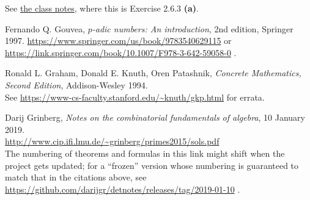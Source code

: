 \documentclass[paper=a4, fontsize=12pt]{scrartcl} %
\theoremstyle{plainsl}
\theoremstyle{definition}
\theoremstyle{remark}
\begin{document}
See
\href{http://www-users.math.umn.edu/~dgrinber/19s/notes.pdf}{the class notes},
where this is Exercise 2.6.3 \textbf{(a)}.

\begin{thebibliography}{99999999}                                                                                         %


Fernando Q. Gouvea,
\textit{$p$-adic numbers: An introduction},
2nd edition, Springer 1997.
\url{https://www.springer.com/us/book/9783540629115} or
\url{https://link.springer.com/book/10.1007/F978-3-642-59058-0} .

Ronald L. Graham, Donald E. Knuth, Oren Patashnik,
\textit{Concrete Mathematics, Second Edition}, Addison-Wesley 1994.\\
See \url{https://www-cs-faculty.stanford.edu/~knuth/gkp.html} for errata.

Darij Grinberg,
\textit{Notes on the combinatorial fundamentals of algebra},
10 January 2019. \\
\url{http://www.cip.ifi.lmu.de/~grinberg/primes2015/sols.pdf}
\\
The numbering of theorems and formulas in this link might shift
when the project gets updated; for a ``frozen'' version whose
numbering is guaranteed to match that in the citations above, see
\url{https://github.com/darijgr/detnotes/releases/tag/2019-01-10} .

\end{thebibliography}
\end{document}
